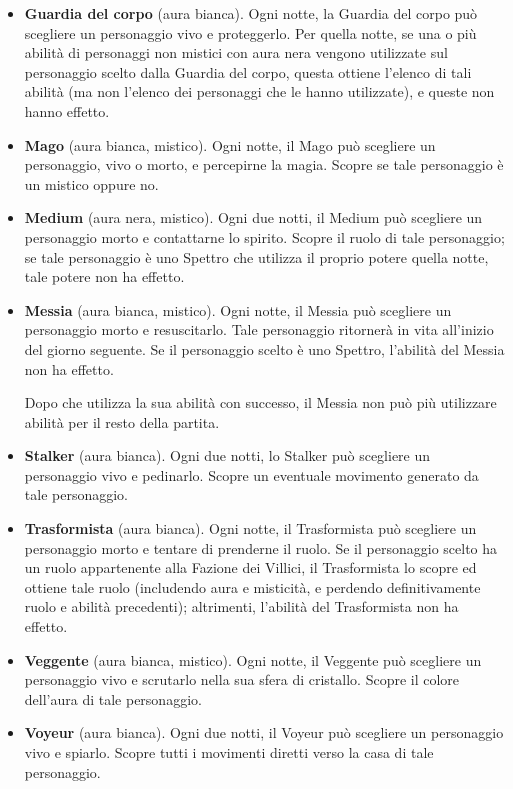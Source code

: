 \documentclass[a4paper,10pt]{article}
\begin{document}
\begin{itemize}
	\item {\bf Guardia del corpo} (aura bianca). Ogni notte, la Guardia del corpo può scegliere un personaggio vivo e proteggerlo. Per quella notte, se una o più abilità di personaggi non mistici con aura nera vengono utilizzate sul personaggio scelto dalla Guardia del corpo, questa ottiene l'elenco di tali abilità (ma non l'elenco dei personaggi che le hanno utilizzate), e queste non hanno effetto.

	\item {\bf Mago} (aura bianca, mistico). Ogni notte, il Mago può scegliere un personaggio, vivo o morto, e percepirne la magia. Scopre se tale personaggio è un mistico oppure no.
	
	\item {\bf Medium} (aura nera, mistico). Ogni due notti, il Medium può scegliere un personaggio morto e contattarne lo spirito. Scopre il ruolo di tale personaggio; se tale personaggio è uno Spettro che utilizza il proprio potere quella notte, tale potere non ha effetto.
 
	\item {\bf Messia} (aura bianca, mistico). Ogni notte, il Messia può scegliere un personaggio morto e resuscitarlo. Tale personaggio ritornerà in vita all'inizio del giorno seguente. Se il personaggio scelto è uno Spettro, l'abilità del Messia non ha effetto.

    Dopo che utilizza la sua abilità con successo, il Messia non può più utilizzare abilità per il resto della partita.
	
	\item {\bf Stalker} (aura bianca). Ogni due notti, lo Stalker può scegliere un personaggio vivo e pedinarlo. Scopre un eventuale movimento generato da tale personaggio.
	
	\item {\bf Trasformista} (aura bianca). Ogni notte, il Trasformista può scegliere un personaggio morto e tentare di prenderne il ruolo. Se il personaggio scelto ha un ruolo appartenente alla Fazione dei Villici, il Trasformista lo scopre ed ottiene tale ruolo (includendo aura e misticità, e perdendo definitivamente ruolo e abilità precedenti); altrimenti, l'abilità del Trasformista non ha effetto.
	
	\item {\bf Veggente} (aura bianca, mistico). Ogni notte, il Veggente può scegliere un personaggio vivo e scrutarlo nella sua sfera di cristallo. Scopre il colore dell'aura di tale personaggio.

	\item {\bf Voyeur} (aura bianca). Ogni due notti, il Voyeur può scegliere un personaggio vivo e spiarlo. Scopre tutti i movimenti diretti verso la casa di tale personaggio.
	
\end{itemize}
\end{document}
